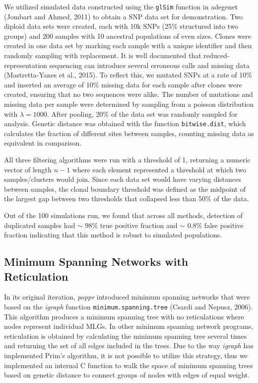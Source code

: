 \documentclass{frontiersSCNS} %
\begin{document}
We utilized simulated data constructed using the \texttt{glSim} function
in adegenet (Jombart and Ahmed, 2011) to obtain a SNP data set for
demonstration. Two diploid data sets were created, each with 10k SNPs
(25\% structured into two groups) and 200 samples with 10 ancestral
populations of even sizes. Clones were created in one data set by
marking each sample with a unique identifier and then randomly sampling
with replacement. It is well documented that reduced- representation
sequencing can introduce several erroneous calls and missing data
(Mastretta-Yanes et al., 2015). To reflect this, we mutated SNPs at a
rate of 10\% and inserted an average of 10\% missing data for each
sample after clones were created, ensuring that no two sequences were
alike. The number of mutations and missing data per sample were
determined by sampling from a poisson distribution with
\(\lambda = 1000\). After pooling, 20\% of the data set was randomly
sampled for analysis. Genetic distance was obtained with the function
\texttt{bitwise.dist}, which calculates the fraction of different sites
between samples, counting missing data as equivalent in comparison.

All three filtering algorithms were run with a threshold of 1, returning
a numeric vector of length \(n - 1\) where each element represented a
threshold at which two samples/clusters would join. Since each data set
would have varying distances between samples, the clonal boundary
threshold was defined as the midpoint of the largest gap between two
thresholds that collapsed less than 50\% of the data.

Out of the 100 simulations run, we found that across all methods,
detection of duplicated samples had \(\sim\) 98\% true positive fraction
and \(\sim\) 0.8\% false positive fraction indicating that this method
is robust to simulated populations.

\subsection*{Minimum Spanning Networks with
Reticulation}\label{minimum-spanning-networks-with-reticulation}

In its original iteration, \emph{poppr} introduced minimum spanning
networks that were based on the \emph{igraph} function
\texttt{minimum.spanning.tree} (Csardi and Nepusz, 2006). This algorithm
produces a minimum spanning tree with no reticulations where nodes
represent individual MLGs. In other minimum spanning network programs,
reticulation is obtained by calculating the minimum spanning tree
several times and returning the set of all edges included in the trees.
Due to the way \emph{igraph} has implemented Prim's algorithm, it is not
possible to utilize this strategy, thus we implemented an internal C
function to walk the space of minimum spanning trees based on genetic
distance to connect groups of nodes with edges of equal weight.
\end{document}
